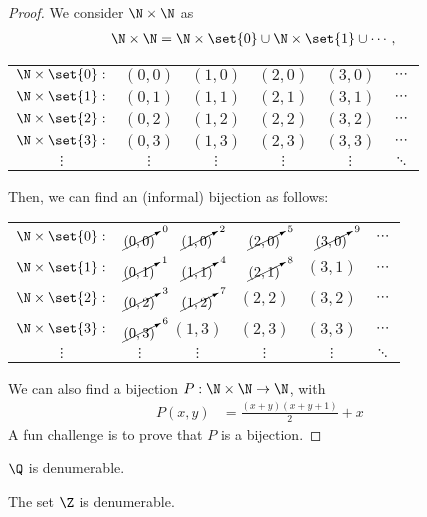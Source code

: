 \documentclass[10pt]{mypackage}
\begin{document}
\begin{proof}
  We consider $\N\times \N$ as
  \begin{align*}
    \N \times \N &= \N \times \set{0} \cup \N\times \set{1} \cup \cdots,
  \end{align*}
  \begin{center}
    \begin{tabular}{cccccc}
      $\N\times \set{0}:$ & $(0,0)$ & $(1,0)$ & $(2,0)$ & $(3,0)$ & $\cdots$\\
      $\N\times \set{1}:$ & $(0,1)$ & $(1,1)$ & $(2,1)$ & $(3,1)$ & $\cdots$\\
      $\N\times \set{2}:$ & $(0,2)$ & $(1,2)$ & $(2,2)$ & $(3,2)$ & $\cdots$\\
      $\N\times \set{3}:$ & $(0,3)$ & $(1,3)$ & $(2,3)$ & $(3,3)$ & $\cdots$\\
      $\vdots$ & $\vdots$ & $\vdots$ & $\vdots$ & $\vdots$ & $\ddots$
    \end{tabular}
  \end{center}
  Then, we can find an (informal) bijection as follows:
  \begin{center}
    \begin{tabular}{cccccc}
      $\N\times \set{0}:$ & $\cancelto{0}{(0,0)}$ & $\cancelto{2}{(1,0)}$ & $\cancelto{5}{(2,0)}$ & $\cancelto{9}{(3,0)}$ & $\cdots$\\
      $\N\times \set{1}:$ & $\cancelto{1}{(0,1)}$ & $\cancelto{4}{(1,1)}$ & $\cancelto{8}{(2,1)}$ & $(3,1)$ & $\cdots$\\
      $\N\times \set{2}:$ & $\cancelto{3}{(0,2)}$ & $\cancelto{7}{(1,2)}$ & $(2,2)$ & $(3,2)$ & $\cdots$\\
      $\N\times \set{3}:$ & $\cancelto{6}{(0,3)}$ & $(1,3)$ & $(2,3)$ & $(3,3)$ & $\cdots$\\
      $\vdots$ & $\vdots$ & $\vdots$ & $\vdots$ & $\vdots$ & $\ddots$
    \end{tabular}
  \end{center}
  We can also find a bijection $P: \N\times \N \rightarrow \N$, with
  \begin{align*}
    P\left(x,y\right) &= \frac{(x+y)(x+y+1)}{2} + x
  \end{align*}
  A fun challenge is to prove that $P$ is a bijection.
\end{proof}
\begin{theorem}
  $\Q$ is denumerable.
\end{theorem}
\begin{theorem}
  The set $\Z$ is denumerable.
\end{theorem}
\end{document}
